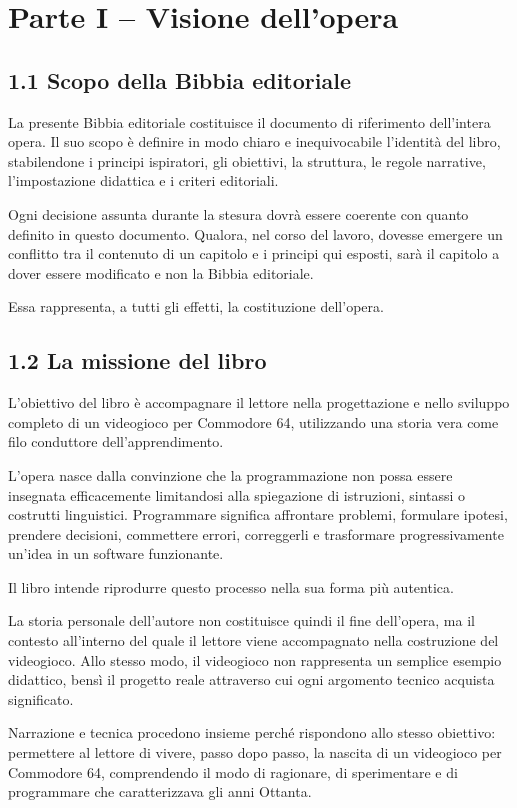 \documentclass{article}
\author{utente}
\date{2026-08-18}
\begin{document}
\section[Parte I – Visione dell{}'opera]{Parte I – Visione dell'opera}
\subsection{1.1 Scopo della Bibbia editoriale}
La presente Bibbia editoriale costituisce il documento di riferimento dell'intera opera. Il suo scopo è definire in modo
chiaro e inequivocabile l'identità del libro, stabilendone i principi ispiratori, gli obiettivi, la struttura, le
regole narrative, l'impostazione didattica e i criteri editoriali.

Ogni decisione assunta durante la stesura dovrà essere coerente con quanto definito in questo documento. Qualora, nel
corso del lavoro, dovesse emergere un conflitto tra il contenuto di un capitolo e i principi qui esposti, sarà il
capitolo a dover essere modificato e non la Bibbia editoriale.

Essa rappresenta, a tutti gli effetti, la costituzione dell'opera.

\subsection{1.2 La missione del libro}
L'obiettivo del libro è accompagnare il lettore nella progettazione e nello sviluppo completo di un videogioco per
Commodore 64, utilizzando una storia vera come filo conduttore dell'apprendimento.

L'opera nasce dalla convinzione che la programmazione non possa essere insegnata efficacemente limitandosi alla
spiegazione di istruzioni, sintassi o costrutti linguistici. Programmare significa affrontare problemi, formulare
ipotesi, prendere decisioni, commettere errori, correggerli e trasformare progressivamente un'idea in un software
funzionante.

Il libro intende riprodurre questo processo nella sua forma più autentica.

La storia personale dell'autore non costituisce quindi il fine dell'opera, ma il contesto all'interno del quale il
lettore viene accompagnato nella costruzione del videogioco. Allo stesso modo, il videogioco non rappresenta un
semplice esempio didattico, bensì il progetto reale attraverso cui ogni argomento tecnico acquista significato.

Narrazione e tecnica procedono insieme perché rispondono allo stesso obiettivo: permettere al lettore di vivere, passo
dopo passo, la nascita di un videogioco per Commodore 64, comprendendo il modo di ragionare, di sperimentare e di
programmare che caratterizzava gli anni Ottanta.
\end{document}
